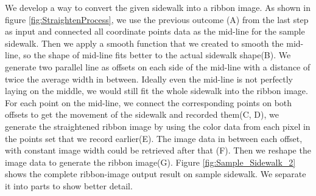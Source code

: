 

We develop a way to convert the given sidewalk into a ribbon image. 
As shown in figure \ref{fig:StraightenProcess}, we use the previous outcome (A) from the last step as input and connected all coordinate points data as the mid-line for the sample sidewalk. 
Then we apply a smooth function that we created to smooth the mid-line, so the shape of mid-line fits better to the actual sidewalk shape(B). 
We generate two parallel line as offsets on each side of the mid-line with a distance of twice the average width in between. 
Ideally even the mid-line is not perfectly laying on the middle, we would still fit the whole sidewalk into the ribbon image. 
For each point on the mid-line, we connect the corresponding points on both offsets to get the movement of the sidewalk and recorded them(C, D), we generate the straightened ribbon image by using the color data from each pixel in the points set that we record earlier(E). 
The image data in between each offset, with constant image width could be retrieved after that (F).
Then we reshape the image data to generate the ribbon image(G). 
Figure \ref{fig:Sample_Sidewalk_2} shows the complete ribbon-image output result on sample sidewalk. We separate it into parts to show better detail. 

